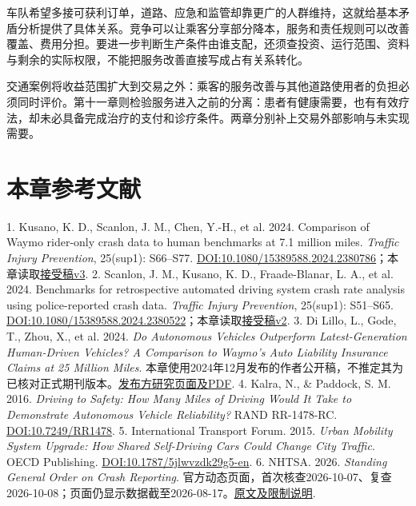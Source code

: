 \documentclass[UTF8,fontset=windows,12pt,a4paper,oneside,openany]{ctexbook}
\begin{document}
车队希望多接可获利订单，道路、应急和监管却靠更广的人群维持，这就给基本矛盾分析提供了具体关系。竞争可以让乘客分享部分降本，服务和责任规则可以改善覆盖、费用分担。要进一步判断生产条件由谁支配，还须查投资、运行范围、资料与剩余的实际权限，不能把服务改善直接写成占有关系转化。

交通案例将收益范围扩大到交易之外：乘客的服务改善与其他道路使用者的负担必须同时评价。第十一章则检验服务进入之前的分离：患者有健康需要，也有有效疗法，却未必具备完成治疗的支付和诊疗条件。两章分别补上交易外部影响与未实现需要。

\section*{本章参考文献}

1. Kusano, K. D., Scanlon, J. M., Chen, Y.-H., et al. 2024. Comparison of Waymo rider-only crash data to human benchmarks at 7.1 million miles. \emph{Traffic Injury Prevention}, 25(sup1): S66–S77. \href{https://doi.org/10.1080/15389588.2024.2380786}{DOI:10.1080/15389588.2024.2380786}；本章读取\href{https://arxiv.org/html/2312.12675v3}{接受稿v3}.
2. Scanlon, J. M., Kusano, K. D., Fraade-Blanar, L. A., et al. 2024. Benchmarks for retrospective automated driving system crash rate analysis using police-reported crash data. \emph{Traffic Injury Prevention}, 25(sup1): S51–S65. \href{https://doi.org/10.1080/15389588.2024.2380522}{DOI:10.1080/15389588.2024.2380522}；本章读取\href{https://arxiv.org/html/2312.13228v2}{接受稿v2}.
3. Di Lillo, L., Gode, T., Zhou, X., et al. 2024. \emph{Do Autonomous Vehicles Outperform Latest-Generation Human-Driven Vehicles? A Comparison to Waymo's Auto Liability Insurance Claims at 25 Million Miles}. 本章使用2024年12月发布的作者公开稿，不推定其为已核对正式期刊版本。\href{https://waymo.com/research/do-autonomous-vehicles-outperform-latest-generation-human-driven-vehicles-25-million-miles/}{发布方研究页面及PDF}.
4. Kalra, N., \& Paddock, S. M. 2016. \emph{Driving to Safety: How Many Miles of Driving Would It Take to Demonstrate Autonomous Vehicle Reliability?} RAND RR-1478-RC. \href{https://doi.org/10.7249/RR1478}{DOI:10.7249/RR1478}.
5. International Transport Forum. 2015. \emph{Urban Mobility System Upgrade: How Shared Self-Driving Cars Could Change City Traffic}. OECD Publishing. \href{https://doi.org/10.1787/5jlwvzdk29g5-en}{DOI:10.1787/5jlwvzdk29g5-en}.
6. NHTSA. 2026. \emph{Standing General Order on Crash Reporting}. 官方动态页面，首次核查2026-10-07、复查2026-10-08；页面仍显示数据截至2026-08-17。\href{https://www.nhtsa.gov/laws-regulations/standing-general-order-crash-reporting}{原文及限制说明}.
\end{document}
